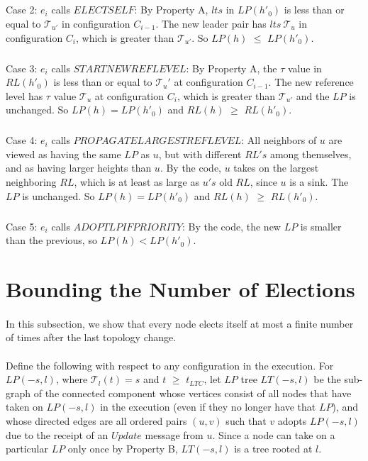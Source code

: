 \subparagraph{}Case 2: $e_i$ calls $ELECTSELF$: By Property A, $lts$ in $LP(h'_0 )$ is less than or equal to $\mathcal{T} _{u'}$ in configuration $C_{i-1}$. The new leader pair has $lts~\mathcal{T} _u$ in configuration $C_i$, which is greater than $\mathcal{T} _{u'}$. So $LP(h)$ $\leq$ $LP(h'_0 )$.
\subparagraph{}Case 3: $e_i$ calls $STARTNEWREFLEVEL$: By Property A, the $\tau$ value in $RL(h'_0 )$ is less than or equal to $\mathcal{T}_u'$ at configuration $C_{i-1}$. The new reference level has $\tau$ value $\mathcal{T}_u$ at configuration $C_i$, which is greater than $\mathcal{T}_{u'}$ and the $LP$ is unchanged. So $LP(h) = LP(h'_0 )$ and $RL(h)$ $\geq$ $RL(h'_0 )$.
\subparagraph{}Case 4: $e_i$ calls $PROPAGATELARGESTREFLEVEL$: All neighbors of $u$ are viewed as having the same $LP$ as $u$, but with different $RL's$ among themselves, and as having larger heights than $u$. By the code, $u$ takes on the largest neighboring $RL$, which is at least as large as $u's$ old $RL$, since $u$ is a sink. The $LP$ is unchanged. So $LP(h) = LP(h'_0 )$ and $RL(h)$ $\geq$ $RL(h'_0 )$.
\subparagraph{}Case 5: $e_i$ calls $ADOPTLPIFPRIORITY$: By the code, the new $LP$ is smaller than the previous, so $LP(h) < LP(h'_0 )$.
\newpage
\section{Bounding the Number of Elections}
\paragraph{}In this subsection, we show that every node elects itself at most a finite number of times after the last topology change.
\paragraph{}Define the following with respect to any configuration in the execution. For $LP (-s, l)$, where $\mathcal{T}_l (t) = s$ and $t$ $\geq$ $t_{LTC}$, let $LP$ tree $LT (-s, l)$ be the sub-graph of the connected component whose vertices consist of all nodes that have taken on $LP (-s, l)$ in the execution (even if they no longer have that $LP$), and whose directed edges are all ordered pairs $(u, v)$ such that $v$ adopts $LP (-s, l)$ due to the receipt of an $Update$ message from $u$. Since a node can take on a particular $LP$ only once by Property B, $LT (-s, l)$ is a tree rooted at $l$.

